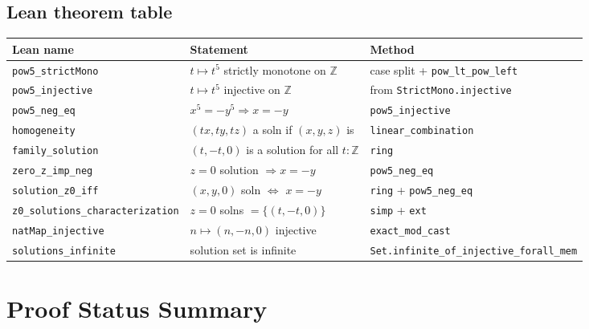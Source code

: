 \documentclass[12pt,a4paper]{article}
\theoremstyle{definition}
\newcommand{\Z}{\mathbb{Z}}
\begin{document}
\subsection{Lean theorem table}

\begin{center}
\begin{tabular}{lll}
  \toprule
  Lean name & Statement & Method \\
  \midrule
  \texttt{pow5\_strictMono} & $t \mapsto t^5$ strictly monotone on $\Z$ & case split + \texttt{pow\_lt\_pow\_left} \\
  \texttt{pow5\_injective} & $t \mapsto t^5$ injective on $\Z$ & from \texttt{StrictMono.injective} \\
  \texttt{pow5\_neg\_eq} & $x^5 = -y^5 \Rightarrow x = -y$ & \texttt{pow5\_injective} \\
  \texttt{homogeneity} & $(tx,ty,tz)$ a soln if $(x,y,z)$ is & \texttt{linear\_combination} \\
  \texttt{family\_solution} & $(t,-t,0)$ is a solution for all $t:\Z$ & \texttt{ring} \\
  \texttt{zero\_z\_imp\_neg} & $z=0$ solution $\Rightarrow x=-y$ & \texttt{pow5\_neg\_eq} \\
  \texttt{solution\_z0\_iff} & $(x,y,0)$ soln $\iff$ $x=-y$ & \texttt{ring} + \texttt{pow5\_neg\_eq} \\
  \texttt{z0\_solutions\_characterization} & $z=0$ solns $= \{(t,-t,0)\}$ & \texttt{simp} + \texttt{ext} \\
  \texttt{natMap\_injective} & $n \mapsto (n,-n,0)$ injective & \texttt{exact\_mod\_cast} \\
  \texttt{solutions\_infinite} & solution set is infinite & \texttt{Set.infinite\_of\_injective\_forall\_mem} \\
  \bottomrule
\end{tabular}
\end{center}

\section{Proof Status Summary}\label{sec:status}
\end{document}
